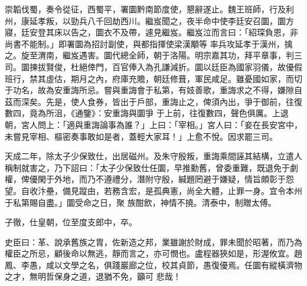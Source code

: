 \begin{pinyinscope}
 崇韜伐蜀，奏令從征，西蜀平，署圜黔南節度使，懇辭遂止。魏王班師，行及利州，康延孝叛，以勁兵八千回劫西川。繼岌聞之，夜半命中使李廷安召圜，圜方寢，廷安登其床以告之，圜衣不及帶，遽見繼岌。繼岌泣而言曰：「紹琛負恩，非尚書不能制。」即署圜為招討副使，與都指揮使梁漢顒等
 率兵攻延孝于漢州，擒之。旋至渭南，繼岌遇害。圜代總全師，朝于洛陽。明宗嘉其功，拜平章事，判三司。圜揀拔賢俊，杜絕倖門，百官俸入為孔謙減折。圜以廷臣為國家羽儀，故優假班行，禁其虛估，期月之內，府庫充贍，朝廷修葺，軍民咸足。雖憂國如家，而切于功名，故為安重誨所忌。嘗與重誨會于私第，有妓善歌，重誨求之不得，嫌隙自茲而深矣。先是，使人食券，皆出于戶部，重誨止之，俾須內出，爭于御前，往復數四，竟為所沮，《通鑒》：安重誨與圜爭
 于上前，往復數四，聲色俱厲。上退朝，宮人問上：「適與重誨論事為誰？」上曰：「宰相。」宮人曰：「妾在長安宮中，未嘗見宰相、樞密奏事敢如是者，蓋輕大家耳！」上愈不悅。因求罷三司。



 天成二年，除太子少保致仕，出居磁州。及朱守殷叛，重誨乘間誣其結構，立遣人稱制就害之，乃下詔曰：「太子少保致仕任圜，早推勳舊，曾委重難，既退免于劇權，俾優閑于外地，而乃不遵禮分，潛附守殷，緘題罔避于嫌疑，情旨頗彰于怨望。自收汴壘，備見蹤由，若務含宏，是孤典憲，尚全大體，止罪一身。宜令本州于私第賜自盡。」圜受命之日，聚
 族酣飲，神情不撓。清泰中，制贈太傅。



 子徹，仕皇朝，位至度支郎中，卒。



 史臣曰：革、說承舊族之胄，佐新造之邦，業雖謝於財成，罪未聞於昭著，而乃為權臣之所忌，顧後命以無逃，靜而言之，亦可憫也。盧程器狹如是，形渥攸宜。趙鳳、李愚，咸以文學之名，俱踐巖廊之位，校其貞節，愚復優焉。任圜有縱橫濟物之才，無明哲保身之道，退猶不免，籲可
 悲哉！



\end{pinyinscope}